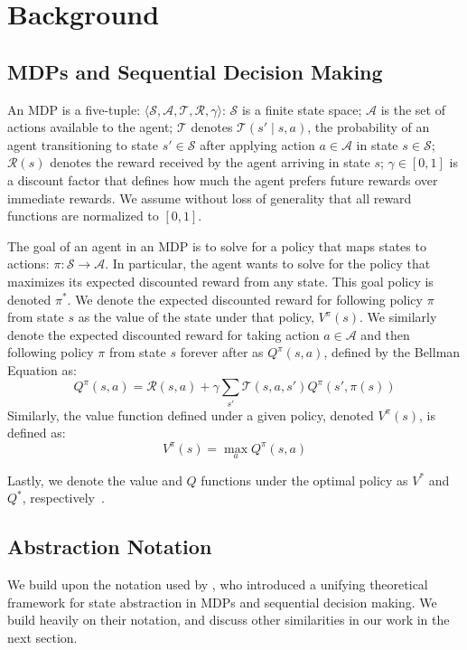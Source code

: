 \section{Background}


\subsection{\acp{MDP} and Sequential Decision Making}
An \ac{MDP} is a five-tuple: $\langle \mathcal{S}, \mathcal{A}, \mathcal{T}, \mathcal{R}, \gamma \rangle$: $\mathcal{S}$ is a finite state space; $\mathcal{A}$ is the set of actions available to the agent; $\mathcal{T}$ denotes $\mathcal{T}(s' \mid s,a)$, the probability of an agent transitioning to state $s' \in \mathcal{S}$ after applying action $a \in \mathcal{A}$ in state $s \in \mathcal{S}$; $\mathcal{R}(s)$ denotes the reward received by the agent arriving in state $s$; $\gamma \in [0, 1]$ is a discount  factor that defines how much the agent prefers future rewards over immediate rewards. We assume without loss of generality that all reward functions are normalized to $[0,1]$.

The goal of an agent in an \ac{MDP} is to solve for a policy that maps states to actions: $\pi: \mathcal{S} \rightarrow \mathcal{A}$. In particular, the agent wants to solve for the policy that maximizes its expected discounted reward from any state. This goal policy is denoted $\pi^*$. We denote the expected discounted reward for following policy $\pi$ from state $s$ as the value of the state under that policy, $V^\pi(s)$. We similarly denote the expected discounted reward for taking action $a \in \mathcal{A}$ and then following policy $\pi$ from state $s$ forever after as $Q^\pi(s,a)$, defined by the Bellman Equation as:
\begin{equation}
Q^\pi(s,a) = \mathcal{R}(s,a) + \gamma \sum_{s'} \mathcal{T}(s,a,s') Q^\pi(s',\pi(s))
\end{equation}
Similarly, the value function defined under a given policy, denoted $V^\pi(s)$, is defined as:
\begin{equation}
V^\pi(s) = \max_a Q^\pi(s,a)
\end{equation}

Lastly, we denote the value and $Q$ functions under the optimal policy as $V^*$ and $Q^*$, respectively~\cite{kaelbling1996reinforcement}.

\subsection{Abstraction Notation}
We build upon the notation used by \citeauthor{li2006towards}, who introduced a unifying theoretical framework for state abstraction in \acp{MDP} and sequential decision making. We build heavily on their notation, and discuss other similarities in our work in the next section.

